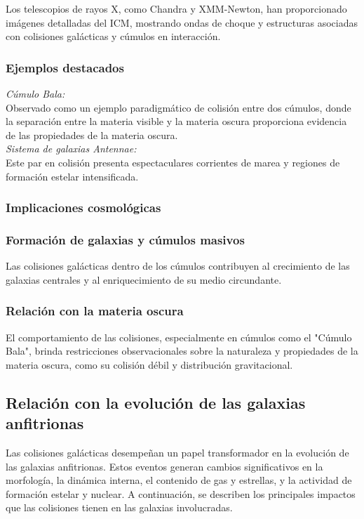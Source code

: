 \documentclass{article}
\begin{document}
Los telescopios de rayos X, como Chandra y XMM-Newton, han proporcionado imágenes detalladas del ICM, mostrando ondas de choque y estructuras asociadas con colisiones galácticas y cúmulos en interacción.
\subsubsection*{Ejemplos destacados}

\textit{Cúmulo Bala:} \\
Observado como un ejemplo paradigmático de colisión entre dos cúmulos, donde la separación entre la materia visible y la materia oscura proporciona evidencia de las propiedades de la materia oscura. \\
\textit{Sistema de galaxias Antennae:} \\
Este par en colisión presenta espectaculares corrientes de marea y regiones de formación estelar intensificada.
\subsubsection{Implicaciones cosmológicas}
\subsubsection*{Formación de galaxias y cúmulos masivos}
Las colisiones galácticas dentro de los cúmulos contribuyen al crecimiento de las galaxias centrales y al enriquecimiento de su medio circundante.

\subsubsection*{Relación con la materia oscura}
El comportamiento de las colisiones, especialmente en cúmulos como el "Cúmulo Bala", brinda restricciones observacionales sobre la naturaleza y propiedades de la materia oscura, como su colisión débil y distribución gravitacional.

\subsection{Relación con la evolución de las galaxias anfitrionas}
Las colisiones galácticas desempeñan un papel transformador en la evolución de las galaxias anfitrionas. Estos eventos generan cambios significativos en la morfología, la dinámica interna, el contenido de gas y estrellas, y la actividad de formación estelar y nuclear. A continuación, se describen los principales impactos que las colisiones tienen en las galaxias involucradas.
\end{document}
